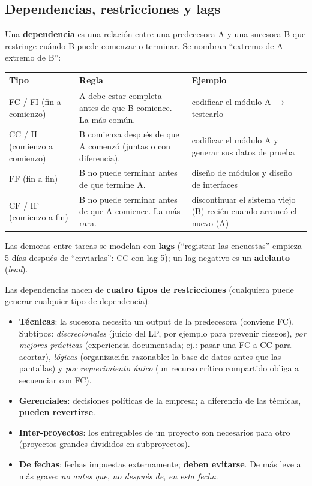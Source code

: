 \documentclass[11pt,a4paper]{article}
\begin{document}
\subsection{Dependencias, restricciones y lags}
Una \textbf{dependencia} es una relación entre una predecesora A y una sucesora B que restringe cuándo B puede
comenzar o terminar. Se nombran ``extremo de A -- extremo de B'':
\begin{center}\small
\begin{tabularx}{\textwidth}{@{}l X X@{}}
\toprule
\textbf{Tipo} & \textbf{Regla} & \textbf{Ejemplo}\\
\midrule
FC / FI (fin a comienzo) & A debe estar completa antes de que B comience. La más común. & codificar el módulo
A $\to$ testearlo\\
CC / II (comienzo a comienzo) & B comienza después de que A comenzó (juntas o con diferencia). & codificar el
módulo A y generar sus datos de prueba\\
FF (fin a fin) & B no puede terminar antes de que termine A. & diseño de módulos y diseño de interfaces\\
CF / IF (comienzo a fin) & B no puede terminar antes de que A comience. La más rara. & discontinuar el sistema
viejo (B) recién cuando arrancó el nuevo (A)\\
\bottomrule
\end{tabularx}
\end{center}
Las demoras entre tareas se modelan con \textbf{lags} (``registrar las encuestas'' empieza 5 días después de
``enviarlas'': CC con lag 5); un lag negativo es un \textbf{adelanto} (\emph{lead}).

Las dependencias nacen de \textbf{cuatro tipos de restricciones} (cualquiera puede generar cualquier tipo de
dependencia):
\begin{itemize}
  \item \textbf{Técnicas}: la sucesora necesita un output de la predecesora (conviene FC). Subtipos:
  \emph{discrecionales} (juicio del LP, por ejemplo para prevenir riesgos), \emph{por mejores prácticas}
  (experiencia documentada; ej.: pasar una FC a CC para acortar), \emph{lógicas} (organización razonable: la
  base de datos antes que las pantallas) y \emph{por requerimiento único} (un recurso crítico compartido obliga
  a secuenciar con FC).
  \item \textbf{Gerenciales}: decisiones políticas de la empresa; a diferencia de las técnicas,
  \textbf{pueden revertirse}.
  \item \textbf{Inter-proyectos}: los entregables de un proyecto son necesarios para otro (proyectos grandes
  divididos en subproyectos).
  \item \textbf{De fechas}: fechas impuestas externamente; \textbf{deben evitarse}. De más leve a más grave:
  \emph{no antes que}, \emph{no después de}, \emph{en esta fecha}.
\end{itemize}
\end{document}
